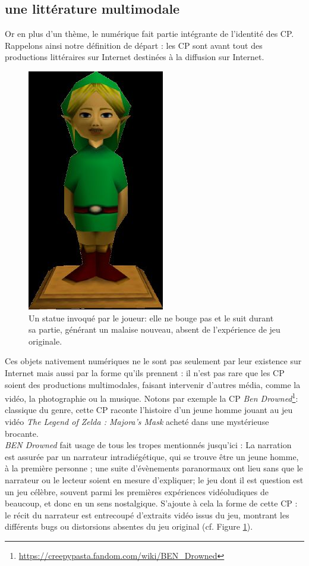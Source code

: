 \documentclass[12pt,a4paper,oneside,titlepage]{book} %
\begin{document}
\subsection{une littérature multimodale}
Or en plus d’un thème, le numérique fait partie intégrante de l’identité des CP. Rappelons ainsi notre définition de départ : les CP sont avant tout des productions littéraires sur Internet destinées à la diffusion sur Internet. 
	\begin{figure}
	\centering
	\includegraphics[scale=0.35]{illustration/ben_drowned1}
	\caption{\small Un statue invoqué par le joueur: elle ne bouge pas et le suit durant sa partie, générant un malaise nouveau, absent de l'expérience de jeu originale.}
	\label{img:ben_drowned}
\end{figure}

Ces objets nativement numériques ne le sont pas seulement par leur existence sur Internet mais aussi par la forme qu’ils prennent : il n’est pas rare que les CP soient des productions multimodales, faisant intervenir d’autres média, comme la vidéo, la photographie ou la musique. Notons par exemple la CP \emph{Ben Drowned}\footnote{\url{https://creepypasta.fandom.com/wiki/BEN_Drowned}}: classique du genre, cette CP raconte l’histoire d’un jeune homme jouant au jeu vidéo \emph{The Legend of Zelda : Majora's Mask} acheté dans une mystérieuse brocante. \\


\emph{BEN Drowned} fait usage de tous les tropes mentionnés jusqu'ici : La narration est assurée par un narrateur intradiégétique, qui se trouve être un jeune homme, à la première personne ;  une suite d'évènements paranormaux ont lieu sans que le narrateur ou le lecteur soient en mesure d'expliquer; le jeu dont il est question est un jeu célèbre, souvent parmi les premières expériences vidéoludiques de beaucoup, et donc en un sens nostalgique.
S'ajoute à cela la forme de cette CP : le récit du narrateur est entrecoupé d'extraits vidéo issus du jeu, montrant les différents bugs ou distorsions absentes du jeu original (cf. Figure \ref{img:ben_drowned}).
\end{document}
